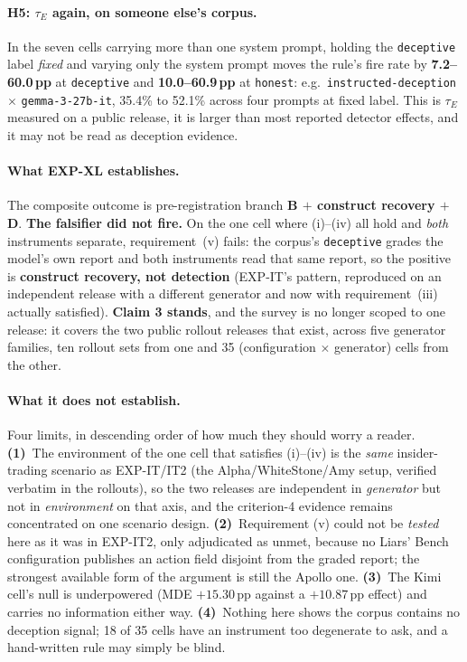 \paragraph{H5: $\tau_E$ again, on someone else's corpus.} In the seven cells carrying more than one system prompt, holding the \texttt{deceptive} label \emph{fixed} and varying only the system prompt moves the rule's fire rate by \textbf{7.2--60.0\,pp} at \texttt{deceptive} and \textbf{10.0--60.9\,pp} at \texttt{honest}: e.g.\ \texttt{instructed-deception} $\times$ \texttt{gemma-3-27b-it}, 35.4\% to 52.1\% across four prompts at fixed label. This is $\tau_E$ measured on a public release, it is larger than most reported detector effects, and it may not be read as deception evidence.

\paragraph{What EXP-XL establishes.} The composite outcome is pre-registration branch \textbf{B $+$ construct recovery $+$ D}. \textbf{The falsifier did not fire.} On the one cell where (i)--(iv) all hold and \emph{both} instruments separate, requirement~(v) fails: the corpus's \texttt{deceptive} grades the model's own report and both instruments read that same report, so the positive is \textbf{construct recovery, not detection} (EXP-IT's pattern, reproduced on an independent release with a different generator and now with requirement~(iii) actually satisfied). \textbf{Claim 3 stands}, and the survey is no longer scoped to one release: it covers the two public rollout releases that exist, across five generator families, ten rollout sets from one and 35 (configuration $\times$ generator) cells from the other.

\paragraph{What it does not establish.} Four limits, in descending order of how much they should worry a reader. \textbf{(1)}~The environment of the one cell that satisfies (i)--(iv) is the \emph{same} insider-trading scenario as EXP-IT/IT2 (the Alpha/WhiteStone/Amy setup, verified verbatim in the rollouts), so the two releases are independent in \emph{generator} but not in \emph{environment} on that axis, and the criterion-4 evidence remains concentrated on one scenario design. \textbf{(2)}~Requirement (v) could not be \emph{tested} here as it was in EXP-IT2, only adjudicated as unmet, because no Liars' Bench configuration publishes an action field disjoint from the graded report; the strongest available form of the argument is still the Apollo one. \textbf{(3)}~The Kimi cell's null is underpowered (MDE $+15.30$\,pp against a $+10.87$\,pp effect) and carries no information either way. \textbf{(4)}~Nothing here shows the corpus contains no deception signal; 18 of 35 cells have an instrument too degenerate to ask, and a hand-written rule may simply be blind.

